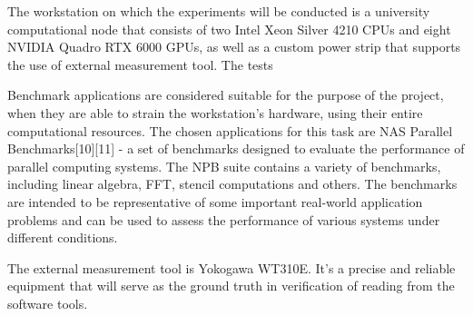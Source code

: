 The workstation on which the experiments will be conducted is
a university computational node that consists of two Intel Xeon
Silver 4210 CPUs and eight NVIDIA Quadro RTX 6000 GPUs, as well
as a custom power strip that supports the use of external
measurement tool. The tests 

Benchmark applications are considered suitable for the purpose
of the project, when they are able to strain the workstation's
hardware, using their entire computational resources. The chosen
applications for this task are NAS Parallel
Benchmarks[10][11] - a set of benchmarks designed to evaluate
the performance of parallel computing systems. The NPB suite
contains a variety of benchmarks, including linear algebra, FFT,
stencil computations and others. The benchmarks are intended to
be representative of some important real-world application problems
and can be used to assess the performance of various systems under
different conditions.

The external measurement tool is Yokogawa WT310E. It's a precise
and reliable equipment that will serve as the ground truth in
verification of reading from the software tools.
